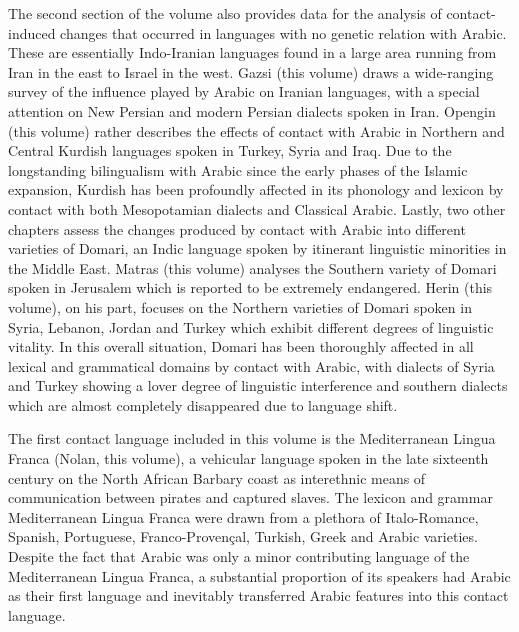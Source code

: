 \documentclass[output=paper]{langsci/langscibook}
\begin{document}
The second section of the volume also provides data for the analysis of contact-induced changes that occurred in languages with no genetic relation with Arabic. These are essentially Indo-Iranian languages found in a large area running from Iran in the east to Israel in the west. Gazsi (this volume) draws a wide-ranging survey of the influence played by Arabic on Iranian languages, with a special attention on New Persian and modern Persian dialects spoken in Iran. Opengin (this volume) rather describes the effects of contact with Arabic in Northern and Central Kurdish languages spoken in Turkey, Syria and Iraq. Due to the longstanding bilingualism with Arabic since the early phases of the Islamic expansion, Kurdish has been profoundly affected in its phonology and lexicon by contact with both Mesopotamian dialects and Classical Arabic. Lastly, two other chapters assess the changes produced by contact with Arabic into different varieties of Domari, an Indic language spoken by itinerant linguistic minorities in the Middle East. Matras (this volume) analyses the Southern variety of Domari spoken in Jerusalem which is reported to be extremely endangered. Herin (this volume), on his part, focuses on the Northern varieties of Domari spoken in Syria, Lebanon, Jordan and Turkey which exhibit different degrees of linguistic vitality. In this overall situation, Domari has been thoroughly affected in all lexical and grammatical domains by contact with Arabic, with dialects of Syria and Turkey showing a lover degree of linguistic interference and southern dialects which are almost completely disappeared due to language shift.  

The first contact language included in this volume is the Mediterranean Lingua Franca (Nolan, this volume), a vehicular language spoken in the late sixteenth century on the North African Barbary coast as interethnic means of communication between pirates and captured slaves. The lexicon and grammar Mediterranean Lingua Franca were drawn from a plethora of Italo-Romance, Spanish, Portuguese, Franco-Provençal, Turkish, Greek and Arabic varieties. Despite the fact that Arabic was only a minor contributing language of the Mediterranean Lingua Franca, a substantial proportion of its speakers had Arabic as their first language and inevitably transferred Arabic features into this contact language.
\end{document}
